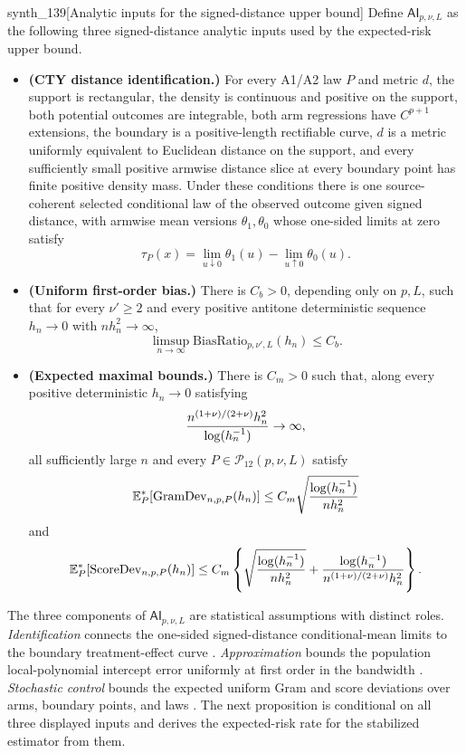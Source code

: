 \begin{definitionv}{synth_139}[Analytic inputs for the signed-distance upper bound]
Define \(\mathsf{AI}_{p,\nu,L}\) as the following three signed-distance analytic inputs used by the expected-risk upper bound.
\begin{itemize}
\item \textbf{(CTY distance identification.)} For every A1/A2 law \(P\) and metric \(d\), the support is rectangular, the density is continuous and positive on the support, both potential outcomes are integrable, both arm regressions have \(C^{p+1}\) extensions, the boundary is a positive-length rectifiable curve, \(d\) is a metric uniformly equivalent to Euclidean distance on the support, and every sufficiently small positive armwise distance slice at every boundary point has finite positive density mass. Under these conditions there is one source-coherent selected conditional law of the observed outcome given signed distance, with armwise mean versions \(\theta_1,\theta_0\) whose one-sided limits at zero satisfy
\[
\tau_P(x)=\lim_{u\downarrow0}\theta_1(u)-\lim_{u\uparrow0}\theta_0(u).
\]
\item \textbf{(Uniform first-order bias.)} There is \(C_b>0\), depending only on \(p,L\), such that for every \(\nu'\ge2\) and every positive antitone deterministic sequence \(h_n\to0\) with \(nh_n^2\to\infty\),
\[
\limsup_{n\to\infty}\mathrm{BiasRatio}_{p,\nu',L}(h_n)\le C_b.
\]
\item \textbf{(Expected maximal bounds.)} There is \(C_m>0\) such that, along every positive deterministic \(h_n\to0\) satisfying
\[
{n^{(1+\nu)/(2+\nu)}h_n^2\over\log(h_n^{-1})}\to\infty,
\]
all sufficiently large \(n\) and every \(P\in\mathcal P_{12}(p,\nu,L)\) satisfy
\[
\mathbb E_P^*[\mathrm{GramDev}_{n,p,P}(h_n)]\le C_m\sqrt{{\log(h_n^{-1})\over nh_n^2}}
\]
and
\[
\mathbb E_P^*[\mathrm{ScoreDev}_{n,p,P}(h_n)]\le C_m\left\{\sqrt{{\log(h_n^{-1})\over nh_n^2}}+{\log(h_n^{-1})\over n^{(1+\nu)/(2+\nu)}h_n^2}\right\}.
\]
\end{itemize}
\end{definitionv}

The three components of \(\mathsf{AI}_{p,\nu,L}\) are statistical assumptions with distinct roles. \emph{Identification} connects the one-sided signed-distance conditional-mean limits to the boundary treatment-effect curve \citep{CattaneoTitiunikYu2026Distance}. \emph{Approximation} bounds the population local-polynomial intercept error uniformly at first order in the bandwidth \citep{Fan1996,Ruppert1994}. \emph{Stochastic control} bounds the expected uniform Gram and score deviations over arms, boundary points, and laws \citep{Vapnik1971,Pollard1984,VanderVaart1996}. The next proposition is conditional on all three displayed inputs and derives the expected-risk rate for the stabilized estimator from them.

